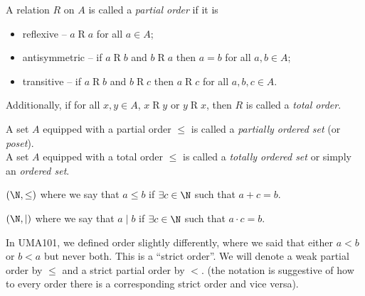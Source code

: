 \begin{definition} \label{def:relations:partial_order}
    A relation $R$ on $A$ is called a \emph{partial order} if it is
    \begin{itemize}
        \item reflexive -- $a \mathrel{R} a$ for all $a \in A$;
        \item antisymmetric -- if $a \mathrel{R} b$ and $b \mathrel{R} a$
        then $a = b$ for all $a, b \in A$;
        \item transitive -- if $a \mathrel{R} b$ and $b \mathrel{R} c$ then
        $a \mathrel{R} c$ for all $a, b, c \in A$.
    \end{itemize}
    Additionally, if for all $x, y \in A$, $x \mathrel{R} y$ or
    $y \mathrel{R} x$, then $R$ is called a \emph{total order}.

    A set $A$ equipped with a partial order $\le$ is called a \emph{partially
    ordered set} (or \emph{poset}). \\
    A set $A$ equipped with a total order $\le$ is called a \emph{totally
    ordered set} or simply an \emph{ordered set}.
\end{definition}
\begin{examples}
    \item $(\N, \le)$ where we say that $a \le b$ if $\exists c \in \N$ such
    that $a + c = b$.
    \item $(\N, \mid)$ where we say that $a \mid b$ if $\exists c \in \N$ such
    that $a \cdot c = b$.
\end{examples}

In UMA101, we defined order slightly differently, where we said that either
$a < b$ or $b < a$ but never both.
This is a ``strict order''.
We will denote a weak partial order by $\le$ and a strict partial order by $<$.
(the notation is suggestive of how to every order there is a corresponding
strict order and vice versa).


